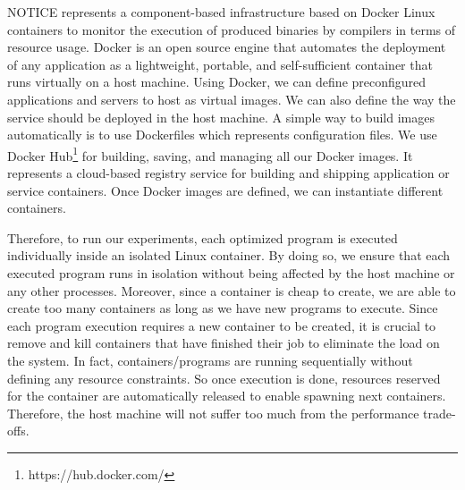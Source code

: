 NOTICE represents a component-based infrastructure based on Docker Linux containers to monitor the execution of produced binaries by compilers in terms of resource usage. 
Docker is an open source engine that automates the deployment of any application as a lightweight, portable, and self-sufficient container that runs virtually on a host machine. 
Using Docker, we can define preconfigured applications and servers to host as virtual images. We can also define the way the service should be deployed in the host machine. 
A simple way to build images automatically is to use Dockerfiles which represents configuration files.
We use Docker Hub\footnote{https://hub.docker.com/} for building, saving, and managing all our Docker images. It represents a cloud-based registry service for building and shipping application or service containers.
Once Docker images are defined, we can instantiate different containers. 

Therefore, to run our experiments, each optimized program is executed individually inside an isolated Linux container. By doing so, we ensure that each executed program runs in isolation without being affected by the host machine or any other processes. Moreover, since a container is cheap to create, we are able to create too many containers as long as we have new programs to execute. 
Since each program execution requires a new container to be created, it is crucial to remove and kill containers that have finished their job to eliminate the load on the system. In fact, containers/programs are running sequentially without defining any resource constraints. So once execution is done, resources reserved for the container are automatically released to enable spawning next containers. Therefore, the host machine will not suffer too much from the performance trade-offs.

